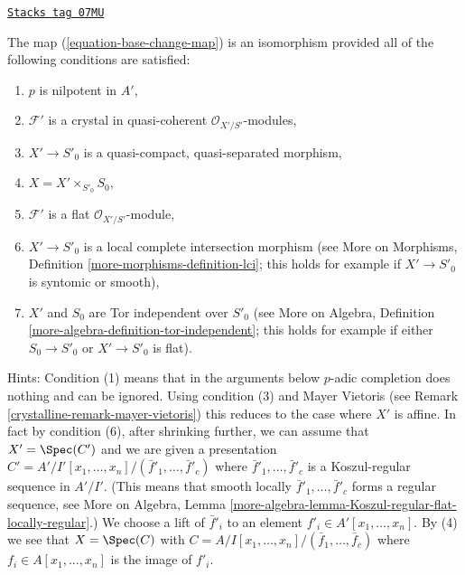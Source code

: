 \begin{remark}

\label{crystalline-remark-base-change-isomorphism}
\href{https://stacks.math.columbia.edu/tag/07MU}{\texttt{Stacks tag 07MU}}

The map (\ref{equation-base-change-map}) is an isomorphism provided
all of the following conditions are satisfied:
\begin{enumerate}
\item $p$ is nilpotent in $A'$,
\item $\mathcal{F}'$ is a crystal in quasi-coherent
$\mathcal{O}_{X'/S'}$-modules,
\item $X' \to S'_0$ is a quasi-compact, quasi-separated morphism,
\item $X = X' \times_{S'_0} S_0$,
\item $\mathcal{F}'$ is a flat $\mathcal{O}_{X'/S'}$-module,
\item $X' \to S'_0$ is a local complete intersection morphism (see
More on Morphisms, Definition \ref{more-morphisms-definition-lci}; this
holds for example if $X' \to S'_0$ is syntomic or smooth),
\item $X'$ and $S_0$ are Tor independent over $S'_0$ (see
More on Algebra, Definition \ref{more-algebra-definition-tor-independent};
this holds for example if either $S_0 \to S'_0$ or $X' \to S'_0$ is flat).
\end{enumerate}
Hints: Condition (1) means that in the arguments below $p$-adic completion
does nothing and can be ignored.
Using condition (3) and Mayer Vietoris (see
Remark \ref{crystalline-remark-mayer-vietoris}) this reduces to the case
where $X'$ is affine. In fact by condition (6), after shrinking
further, we can assume that $X' = \Spec(C')$ and we are given a presentation
$C' = A'/I'[x_1, \ldots, x_n]/(\bar f'_1, \ldots, \bar f'_c)$
where $\bar f'_1, \ldots, \bar f'_c$ is a Koszul-regular sequence in $A'/I'$.
(This means that smooth locally $\bar f'_1, \ldots, \bar f'_c$ forms
a regular sequence, see More on Algebra,
Lemma \ref{more-algebra-lemma-Koszul-regular-flat-locally-regular}.)
We choose a lift of
$\bar f'_i$ to an element $f'_i \in A'[x_1, \ldots, x_n]$. By (4) we see that
$X = \Spec(C)$ with $C = A/I[x_1, \ldots, x_n]/(\bar f_1, \ldots, \bar f_c)$
where $f_i \in A[x_1, \ldots, x_n]$ is the image of $f'_i$.

\end{remark}
